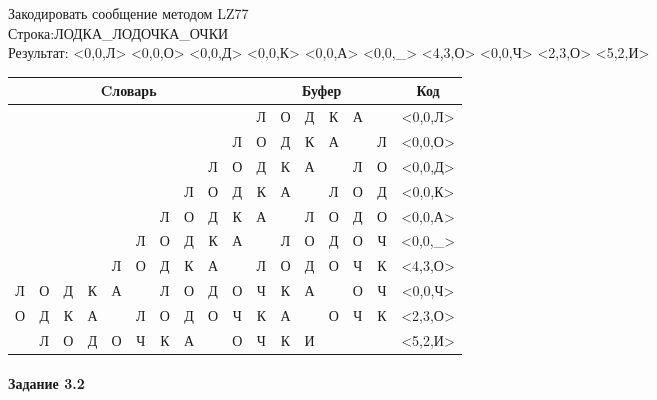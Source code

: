 \documentclass[a4paper, 12pt]{article}
\begin{document}
Закодировать сообщение методом LZ77\\
Строка:ЛОДКА\_ЛОДОЧКА\_ОЧКИ\\
Результат: <0,0,Л> <0,0,О> <0,0,Д> <0,0,К> <0,0,А> <0,0,\_> <4,3,О> <0,0,Ч> <2,3,О> <5,2,И>\\
\begin{table}[h!]
\centering
\begin{tabular}{|c|c|c|c|c|c|c|c|c|c|c|c|c|c|c|c|c|} 
\hline
\multicolumn{10}{|c|}{Cловарь} & \multicolumn{6}{c|}{Буфер} & Код  \\ \hline
  &   &   &   &   &   &   &   &   &   & \cellcolor[HTML]{8CE4F6} Л & О & Д & К & А &   & <0,0,Л>
\\ \hline
  &   &   &   &   &   &   &   &   & Л & \cellcolor[HTML]{8CE4F6} О & Д & К & А &   & Л & <0,0,О>
\\ \hline
  &   &   &   &   &   &   &   & Л & О & \cellcolor[HTML]{8CE4F6} Д & К & А &   & Л & О & <0,0,Д>
\\ \hline
  &   &   &   &   &   &   & Л & О & Д & \cellcolor[HTML]{8CE4F6} К & А &   & Л & О & Д & <0,0,К>
\\ \hline
  &   &   &   &   &   & Л & О & Д & К & \cellcolor[HTML]{8CE4F6} А &   & Л & О & Д & О & <0,0,А>
\\ \hline
  &   &   &   &   & Л & О & Д & К & А & \cellcolor[HTML]{8CE4F6}   & Л & О & Д & О & Ч & <0,0,\_>
\\ \hline
  &   &   &   & \cellcolor[HTML]{FFFF00} Л & \cellcolor[HTML]{FFFF00} О & \cellcolor[HTML]{FFFF00} Д & К & А &   & \cellcolor[HTML]{FFFF00} Л & \cellcolor[HTML]{FFFF00} О & \cellcolor[HTML]{FFFF00} Д & \cellcolor[HTML]{8CE4F6} О & Ч & К & <4,3,О>
\\ \hline
Л & О & Д & К & А &   & Л & О & Д & О & \cellcolor[HTML]{8CE4F6} Ч & К & А &   & О & Ч & <0,0,Ч>
\\ \hline
О & Д & \cellcolor[HTML]{FFFF00} К & \cellcolor[HTML]{FFFF00} А & \cellcolor[HTML]{FFFF00}   & Л & О & Д & О & Ч & \cellcolor[HTML]{FFFF00} К & \cellcolor[HTML]{FFFF00} А & \cellcolor[HTML]{FFFF00}   & \cellcolor[HTML]{8CE4F6} О & Ч & К & <2,3,О>
\\ \hline
  & Л & О & Д & О & \cellcolor[HTML]{FFFF00} Ч & \cellcolor[HTML]{FFFF00} К & А &   & О & \cellcolor[HTML]{FFFF00} Ч & \cellcolor[HTML]{FFFF00} К & \cellcolor[HTML]{8CE4F6} И &   &   &   & <5,2,И>
\\ \hline
\end{tabular}
\end{table}

\paragraph{Задание 3.2}
\end{document}

